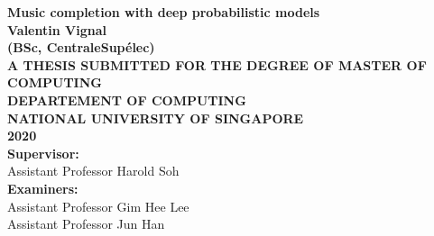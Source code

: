 \documentclass[12pt]{report}
\begin{document}
\pagestyle{empty}
\setlength{\parindent}{0cm}
\begin{center}
    {\textbf{\Large Music completion with deep probabilistic models}}\\
    \vspace{2cm}
    {\textbf{\Large Valentin Vignal}}\\
    \textbf{(BSc, CentraleSupélec)}\\
    \vspace{2cm}
   {\textbf{\Large A THESIS SUBMITTED FOR THE DEGREE OF MASTER OF COMPUTING\\ DEPARTEMENT OF COMPUTING\\ NATIONAL UNIVERSITY OF SINGAPORE\\}}
    \vspace{2.5cm}
    {\textbf{\Large 2020}}\\
    \vspace{2.5cm}
    {\textbf{\large Supervisor:}}\\
    Assistant Professor Harold Soh\\
    {\textbf{\large Examiners:}}\\
    Assistant Professor Gim Hee Lee\\
    Assistant Professor Jun Han
\end{center}
\newpage


% 
%
% 
\end{document}
